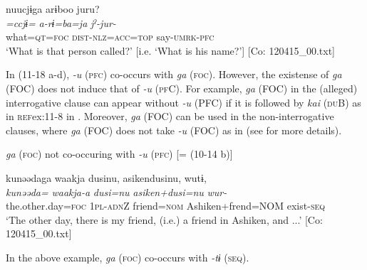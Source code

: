   \ex  
      \glll    nuucjɨga  arɨboo  juru?\\
      \textit{=ccjɨ=}  \textit{a-rɨ=ba=ja}  \textit{jˀ-jur-}\\
      what=\textsc{qt}=\textsc{foc}  \textsc{dist}-\textsc{nlz}=\textsc{acc}=\textsc{top}  say-\textsc{umrk}-\textsc{pfc}\\
      \glt       ‘What is that person called?’ [i.e. ‘What is his name?’] [Co: 120415\_00.txt]
\z
\z

In (11-18 a-d), \textit{{}-u} (\textsc{pfc}) co-occurs with \textit{ga} (\textsc{foc}). However, the existense of \textit{ga} (FOC) does not induce that of \textit{{}-u} (\textsc{pf}C). For example, \textit{ga} (FOC) in the (alleged) interrogative clause can appear without \textit{-u} (PFC) if it is followed by \textit{kai} (\textsc{du}B) as in \textsc{ref}{ex:11-8} in . Moreover, \textit{ga} (FOC) can be used in the non-interrogative clauses, where \textit{ga} (FOC) does not take \textit{{}-u} (FOC) as in  (see  for more details).

\ea\label{ex:11-19}  \textit{ga} (\textsc{foc}) not co-occuring with \textit{-u} (\textsc{pfc}) [= (10-14 b)]
  
      \glll    kunəədaga  waakja  dusinu,  asikendusinu,  wutɨ,\\
    \textit{kunəəda=}  \textit{waakja-a}  \textit{dusi=nu}  \textit{asiken+dusi=nu}  \textit{wur-}\\
    the.other.day=\textsc{foc}  1\textsc{pl}-\textsc{adn}Z  friend=\textsc{nom}  Ashiken+frend=NOM  exist{}-\textsc{seq}\\
    \glt     ‘The other day, there is my friend, (i.e.) a friend in Ashiken, and ...’ [Co: 120415\_00.txt]
\z

In the above example, \textit{ga} (\textsc{foc}) co-occurs with \textit{{}-tɨ} (\textsc{seq}).
